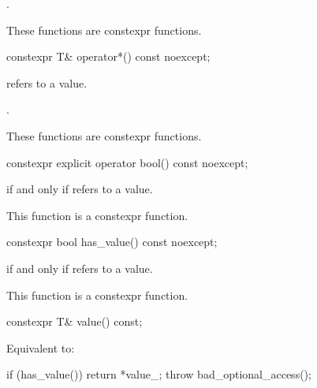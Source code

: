 \documentclass[a4paper,10pt,oneside,openany,final,article]{memoir}
\begin{document}
\begin{wording}
  \begin{itemdescr}
    \pnum
    \returns
    .

    \pnum
    \remarks
    These functions are constexpr functions.
  \end{itemdescr}

  \begin{itemdecl}
    constexpr T&  operator*() const noexcept;
  \end{itemdecl}

  \begin{itemdescr}
    \pnum
    \expects
     refers to a value.

    \pnum
    \returns
    .

    \pnum
    \remarks
    These functions are constexpr functions.
  \end{itemdescr}

  \begin{itemdecl}
    constexpr explicit operator bool() const noexcept;
  \end{itemdecl}

  \begin{itemdescr}
    \pnum
    \returns
     if and only if  refers to a value.

    \pnum
    \remarks
    This function is a constexpr function.
  \end{itemdescr}

  \begin{itemdecl}
    constexpr bool has_value() const noexcept;
  \end{itemdecl}

  \begin{itemdescr}
    \pnum
    \returns
     if and only if  refers to a value.

    \pnum
    \remarks
    This function is a constexpr function.
  \end{itemdescr}

  \begin{itemdecl}
    constexpr T& value() const;
  \end{itemdecl}

  \begin{itemdescr}
    \pnum
    \effects
    Equivalent to:
    \begin{codeblock}
      if (has_value())
          return *value_;
      throw bad_optional_access();
    \end{codeblock}
  \end{itemdescr}


\end{wording}
\end{document}
